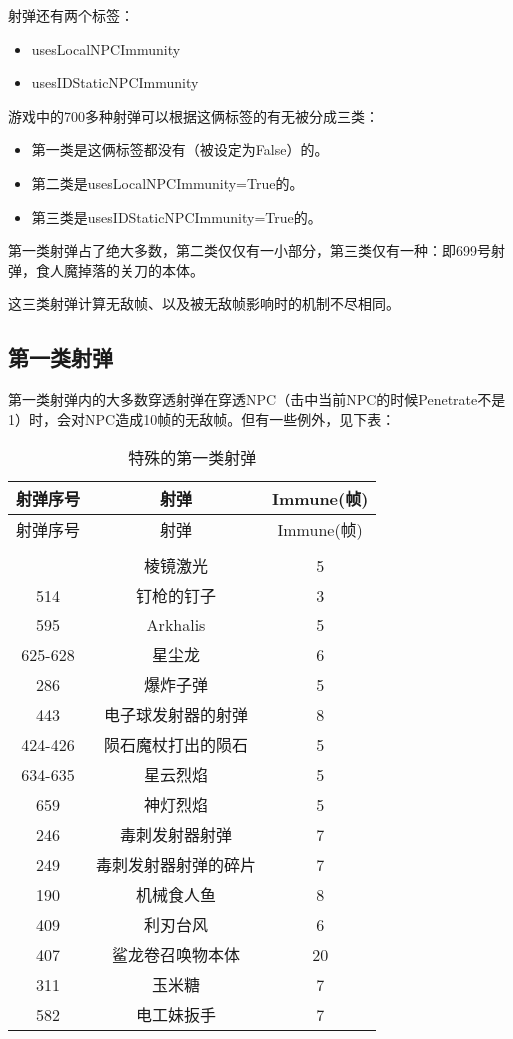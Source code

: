 射弹还有两个标签：

\begin{itemize}
\item usesLocalNPCImmunity
\item usesIDStaticNPCImmunity
\end{itemize}

游戏中的700多种射弹可以根据这俩标签的有无被分成三类：

\begin{itemize}
\item 第一类是这俩标签都没有（被设定为False）的。
\item 第二类是usesLocalNPCImmunity=True的。
\item 第三类是usesIDStaticNPCImmunity=True的。
\end{itemize}

第一类射弹占了绝大多数，第二类仅仅有一小部分，第三类仅有一种：即699号射弹，食人魔掉落的关刀的本体。

这三类射弹计算无敌帧、以及被无敌帧影响时的机制不尽相同。

\subsection{第一类射弹}

第一类射弹内的大多数穿透射弹在穿透NPC（击中当前NPC的时候Penetrate不是1）时，会对NPC造成10帧的无敌帧。但有一些例外，见下表：

\begin{longtable}{|c|c|c|}
\caption{特殊的第一类射弹}\\ \hline
射弹序号&射弹&Immune(帧)\\ \hline
\endfirsthead
\hline 射弹序号&射弹&Immune(帧)\\\hline
\endhead
\\\hline
\endfoot
632 & 棱镜激光 & 5 \\ \hline
514 & 钉枪的钉子 & 3 \\ \hline
595 & Arkhalis & 5 \\ \hline
625-628 & 星尘龙 & 6 \\ \hline
286 & 爆炸子弹 & 5 \\ \hline
443 & 电子球发射器的射弹 & 8 \\ \hline
424-426 & 陨石魔杖打出的陨石 & 5 \\ \hline
634-635 & 星云烈焰 & 5 \\ \hline
659 & 神灯烈焰 & 5 \\ \hline
246 & 毒刺发射器射弹 & 7 \\ \hline
249 & 毒刺发射器射弹的碎片 & 7 \\ \hline
190 & 机械食人鱼 & 8 \\ \hline
409 & 利刃台风 & 6 \\ \hline
407 & 鲨龙卷召唤物本体 & 20 \\ \hline
311 & 玉米糖 & 7 \\ \hline
582 & 电工妹扳手 & 7 \\ \hline
\end{longtable}

